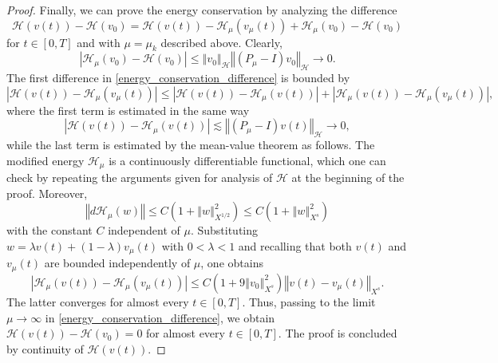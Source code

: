 \documentclass[reqno,12pt,a4paper]{article}
\theoremstyle{plain}
\newcommand{\Abs}[1]{\left\vert #1 \right\vert}
\newcommand{\norm}[1]{\left\Vert #1 \right\Vert}
\begin{document}
\begin{proof}
Finally, we can prove the energy conservation
by analyzing the difference
%
\begin{equation}
\label{energy_conservation_difference}
    \mathcal H(v(t))
    -
    \mathcal H(v_0)
    =
    \mathcal H(v(t))
    -
    \mathcal H_{\mu}(v_{\mu}(t))
    +
    \mathcal H_{\mu}(v_0)
    -
    \mathcal H(v_0)
\end{equation}
%
for $t \in [0, T]$ and with $\mu = \mu_k$ described above.
Clearly,
\[
    \Abs{
        \mathcal H_{\mu}(v_0)
        -
        \mathcal H(v_0)
    }
    \leqslant
    \norm{v_0}_{\mathcal H}
    \norm{( P_{\mu} - I )v_0}_{\mathcal H}
    \to
    0
    .
\]
The first difference in \eqref{energy_conservation_difference}
is bounded by
\[
    \Abs{
        \mathcal H(v(t))
        -
        \mathcal H_{\mu}(v_{\mu}(t))
    }
    \leqslant
    \Abs{
        \mathcal H(v(t))
        -
        \mathcal H_{\mu}(v(t))
    }
    +
    \Abs{
        \mathcal H_{\mu}(v(t))
        -
        \mathcal H_{\mu}(v_{\mu}(t))
    }
    ,
\]
where the first term is estimated in the same way
\[
    \Abs{
        \mathcal H(v(t))
        -
        \mathcal H_{\mu}(v(t))
    }
    \lesssim
    \norm{( P_{\mu} - I )v(t)}_{\mathcal H}
    \to
    0
    ,
\]
while the last term is estimated by the mean-value theorem as follows.
The modified energy $\mathcal H_{\mu}$ is a continuously differentiable functional,
which one can check by repeating the arguments given
for analysis of $\mathcal H$ at the beginning of the proof.
Moreover,
\[
    \norm{d \mathcal H_{\mu}(w)}
    \leqslant
    C
    \left(
        1 + \norm{w}_{X^{1/2}}^2
    \right)
    \leqslant
    C
    \left(
        1 + \norm{w}_{X^s}^2
    \right)
\]
%
with the constant $C$ independent of $\mu$.
Substituting $w = \lambda v(t) + (1 - \lambda) v_{\mu}(t)$
with $0 < \lambda < 1$
and recalling that both $v(t)$ and $v_{\mu}(t)$ are bounded independently of $\mu$,
one obtains
\[
    \Abs{
        \mathcal H_{\mu}(v(t))
        -
        \mathcal H_{\mu}(v_{\mu}(t))
    }
    \leqslant
    C
    \left(
        1 + 9 \norm{v_0}_{X^s}^2
    \right)
    \norm{
        v(t)
        -
        v_{\mu}(t)
    }_{X^s}
    .
\]
%
The latter converges for almost every $t \in [0, T]$.
Thus, passing to the limit $\mu \to \infty$ in \eqref{energy_conservation_difference},
we obtain
\(
    \mathcal H(v(t))
    -
    \mathcal H(v_0)
    =
    0
\)
for almost every $t \in [0, T]$.
The proof is concluded
by continuity of
\(
    \mathcal H(v(t))
    .
\)
%
\end{proof}
\end{document}
